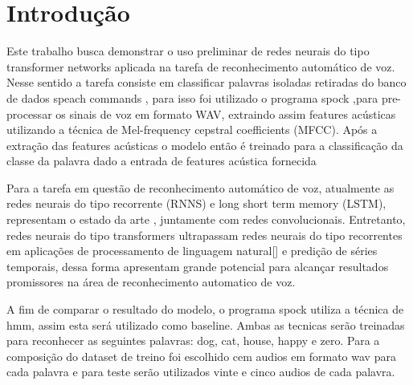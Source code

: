 \documentclass[
	12pt,				%
	openright,			%
	oneside,			%
	a4paper,			%
	chapter=TITLE,		%
	english,			%
	french,				%
	spanish,			%
	brazil				%
	]{abntex2}
\theoremstyle{definition}
\begin{document}

\frenchspacing


\imprimircapa

\textual

\chapter{Introdução}
\label{cap:introducao}
Este trabalho busca demonstrar o uso preliminar de redes neurais do tipo transformer networks  aplicada na tarefa de reconhecimento automático de voz. Nesse sentido a tarefa consiste em classificar palavras isoladas retiradas do banco de dados speach commands , para isso foi utilizado o programa spock ,para pre-processar os sinais de voz em formato WAV, extraindo assim features acústicas utilizando a técnica de Mel-frequency cepstral coefficients (MFCC). Após a extração das features acústicas o modelo então é treinado para a classificação da classe da palavra dado a entrada de features acústica fornecida

Para a tarefa em questão de reconhecimento automático de voz, atualmente as redes neurais do tipo recorrente (RNNS) e long short term memory (LSTM), representam o estado da arte , juntamente com redes convolucionais. Entretanto, redes neurais do tipo transformers ultrapassam redes neurais do tipo recorrentes em aplicações de processamento de linguagem natural[] e predição de séries temporais, dessa forma apresentam grande potencial para alcançar resultados promissores na área de reconhecimento automatico de voz.

A fim de comparar o resultado do modelo, o programa spock utiliza a técnica de hmm, assim esta será utilizado como baseline. Ambas as tecnicas serão treinadas para reconhecer as seguintes palavras: dog, cat, house, happy e zero. Para a composição do dataset de treino foi escolhido cem audios em formato wav para cada palavra e para teste serão utilizados vinte e cinco audios de cada palavra.
\end{document}
